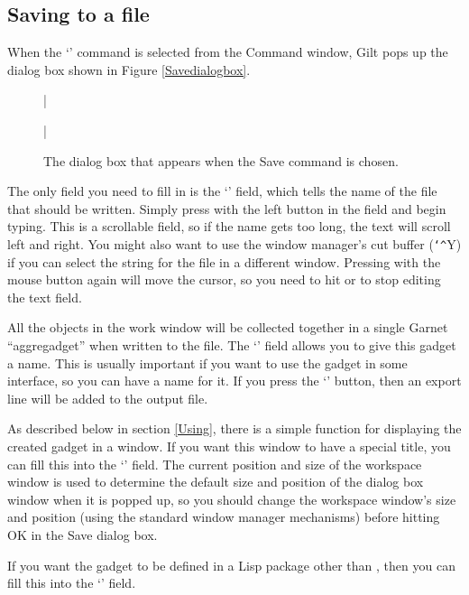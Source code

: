 \subsection{Saving to a file}

When the `' command is selected from the Command window, Gilt
pops up the dialog box shown in Figure \ref{Savedialogbox}.

\begin{figure}
\bar{}
\begin{center}
\end{center}
\caption{The dialog box that appears when the Save command is chosen.}
\bar{}
\end{figure}

The only field you need to fill in is the `' field, which tells
the name of the file that should be written.  Simply press with the
left button in the field and begin typing.  This is a
scrollable field, so if the name gets too long, the text will scroll
left and right.  You might also want to use the window manager's cut
buffer ({\tt\char`\^}Y) if you
can select the string for the file in a different window.  Pressing
with the mouse button again will move the cursor, so you need to hit
 or  to stop editing the text field.

All the objects in the work window will be collected together in a
single Garnet ``aggregadget'' when written to the file.  The
`' field allows you to give this gadget a
name.  This is usually important if you want to use the gadget in some
interface, so you can have a name for it.  If you press the `' button, then an export line will be added to the
output file.

As described below in section \ref{Using}, there is a simple function for
displaying the created gadget in a window.  If you want this window to
have a special title, you can fill this into the `' field.
The current position and size of the workspace window is
used to determine the default size and position of the dialog box
window when it is popped up, so you should change the workspace
window's size and position (using the standard window manager
mechanisms) before hitting OK in the Save dialog box.

If you want the gadget to be defined in a Lisp package other than ,
then you can fill this into the `' field.

